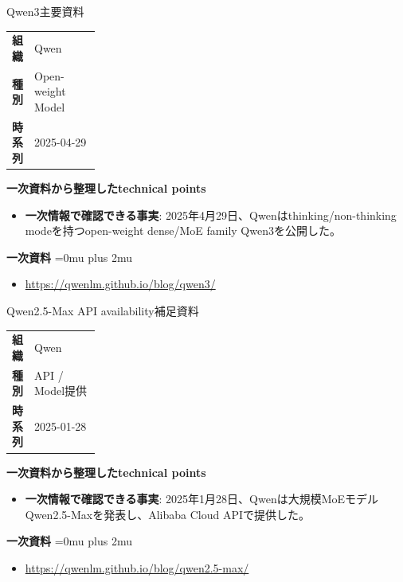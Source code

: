 \begin{technicalnote}{Qwen3}{主要資料}
\begingroup
\begin{tabularx}{\linewidth}{@{}>{\bfseries}p{0.22\linewidth}X@{}}
組織 & Qwen \\
種別 & Open-weight Model \\
時系列 & 2025-04-29 \\
\end{tabularx}
\smallskip
\begin{minipage}{\linewidth}
{\bfseries 一次資料から整理したtechnical points}
\begin{itemize}[leftmargin=1.5em,itemsep=0.35em]
\item \textbf{一次情報で確認できる事実}: 2025年4月29日、Qwenはthinking/non-thinking modeを持つopen-weight dense/MoE family Qwen3を公開した。
\end{itemize}
\begin{samepage}
{\bfseries 一次資料}
\begingroup\sloppy
\Urlmuskip=0mu plus 2mu\relax
\begin{itemize}[leftmargin=1.5em,itemsep=0.25em]
\item {\scriptsize\url{https://qwenlm.github.io/blog/qwen3/}}
\end{itemize}
\endgroup
\end{samepage}
\end{minipage}
\endgroup
\end{technicalnote}
\medskip

\begin{technicalnote}{Qwen2.5-Max API availability}{補足資料}
\begingroup
\begin{tabularx}{\linewidth}{@{}>{\bfseries}p{0.22\linewidth}X@{}}
組織 & Qwen \\
種別 & API / Model提供 \\
時系列 & 2025-01-28 \\
\end{tabularx}
\smallskip
\begin{minipage}{\linewidth}
{\bfseries 一次資料から整理したtechnical points}
\begin{itemize}[leftmargin=1.5em,itemsep=0.35em]
\item \textbf{一次情報で確認できる事実}: 2025年1月28日、Qwenは大規模MoEモデルQwen2.5-Maxを発表し、Alibaba Cloud APIで提供した。
\end{itemize}
\begin{samepage}
{\bfseries 一次資料}
\begingroup\sloppy
\Urlmuskip=0mu plus 2mu\relax
\begin{itemize}[leftmargin=1.5em,itemsep=0.25em]
\item {\scriptsize\url{https://qwenlm.github.io/blog/qwen2.5-max/}}
\end{itemize}
\endgroup
\end{samepage}
\end{minipage}
\endgroup
\end{technicalnote}
\medskip

